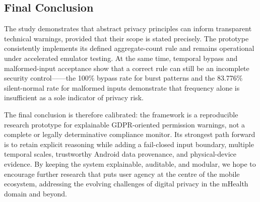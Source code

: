 \subsection{Final Conclusion}

The study demonstrates that abstract privacy principles can inform transparent technical warnings, provided that their scope is stated precisely. The prototype consistently implements its defined aggregate-count rule and remains operational under accelerated emulator testing. At the same time, temporal bypass and malformed-input acceptance show that a correct rule can still be an incomplete security control——the 100\% bypass rate for burst patterns and the 83.776\% silent-normal rate for malformed inputs demonstrate that frequency alone is insufficient as a sole indicator of privacy risk.

The final conclusion is therefore calibrated: the framework is a reproducible research prototype for explainable GDPR-oriented permission warnings, not a complete or legally determinative compliance monitor. Its strongest path forward is to retain explicit reasoning while adding a fail-closed input boundary, multiple temporal scales, trustworthy Android data provenance, and physical-device evidence. By keeping the system explainable, auditable, and modular, we hope to encourage further research that puts user agency at the centre of the mobile ecosystem, addressing the evolving challenges of digital privacy in the mHealth domain and beyond.
